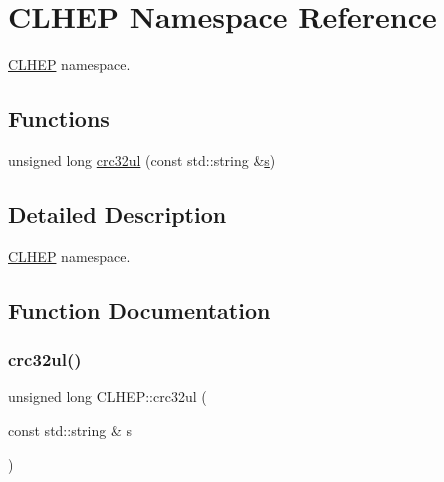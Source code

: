 \hypertarget{namespace_c_l_h_e_p}{}\section{C\+L\+H\+EP Namespace Reference}
\label{namespace_c_l_h_e_p}


\hyperlink{namespace_c_l_h_e_p}{C\+L\+H\+EP} namespace.  


\subsection*{Functions}
\begin{DoxyCompactItemize}
\item 
unsigned long \hyperlink{namespace_c_l_h_e_p_a5222e5dfca56b9684ab59bea27e89405}{crc32ul} (const std\+::string \&\hyperlink{_volumes_8cpp_a17ca6bfc8040d695d3cada22a4763d40}{s})
\end{DoxyCompactItemize}


\subsection{Detailed Description}
\hyperlink{namespace_c_l_h_e_p}{C\+L\+H\+EP} namespace. 

\subsection{Function Documentation}
\hypertarget{namespace_c_l_h_e_p_a5222e5dfca56b9684ab59bea27e89405}{}\label{namespace_c_l_h_e_p_a5222e5dfca56b9684ab59bea27e89405} 
\subsubsection{\texorpdfstring{crc32ul()}{crc32ul()}}
{\footnotesize\ttfamily unsigned long C\+L\+H\+E\+P\+::crc32ul (\begin{DoxyParamCaption}\item[{const std\+::string \&}]{s }\end{DoxyParamCaption})}

